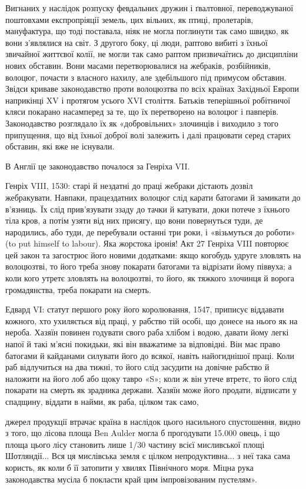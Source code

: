Вигнаних у наслідок розпуску февдальних дружин і ґвалтовної,
переводжуваної поштовхами експропріяції земель, цих
вільних, як птиці, пролетарів, мануфактура, що тоді поставала,
ніяк не могла поглинути так само швидко, як вони з’являлися
на світ. З другого боку, ці люди, раптово вибиті з їхньої звичайної
життєвої колії, не могли так само раптом призвичаїтись до
дисципліни нових обставин. Вони масами перетворювалися на
жебраків, розбійників, волоцюг, почасти з власного нахилу,
але здебільшого під примусом обставин. Звідси криваве законодавство
проти волоцюзтва по всіх країнах Західньої Европи
наприкінці XV і протягом усього XVI століття. Батьків теперішньої
робітничої кляси покарано насамперед за те, що їх перетворено
на волоцюг і павперів. Законодавство розглядало
їх як «добровільних» злочинців і виходило з того припущення,
що від їхньої доброї волі залежить і далі працювати серед старих
обставин, які вже не існували.

В Англії це законодавство почалося за Генріха VII.

Генріх VIII, 1530: старі й нездатні до праці жебраки дістають
дозвіл жебракувати. Навпаки, працездатних волоцюг слід карати
батогами й замикати до в’язниць. Їх слід прив’язувати ззаду до
тачки й катувати, доки потече з їхнього тіла кров, а потім узяти
від них присягу, що вони повернуться туди, де народились,
або туди, де перебували останні три роки, і «візьмуться до роботи»
(to put himself to labour). Яка жорстока іронія! Акт 27
Генріха VIII повторює цей закон та загострює його новими додатками:
якщо когобудь удруге зловлять на волоцюзтві, то його
треба знову покарати батогами та відрізати йому піввуха; а
коли кого утретє зловлять на волоцюзтві, то його, як тяжкого
злочинця й ворога громадянства, треба покарати на смерть.

Едвард VI: статут першого року його королювання, 1547,
приписує віддавати кожного, хто ухиляється від праці, у рабство
тій особі, що донесе на нього як на нероба. Хазяїн повинен годувати
свого раба хлібом і водою, давати йому легкі напої й такі
м’ясні покидьки, які він вважатиме за відповідні. Він має право
батогами й кайданами силувати його до всякої, навіть найогиднішої
праці. Коли раб відлучиться на два тижні, то його слід
засудити на довічне рабство й наложити на його лоб або щоку
тавро «S»; коли ж він утече втретє, то його слід покарати на
смерть як зрадника держави. Хазяїн може його продати, відписати
у спадщину, віддати в найми, як раба, цілком так само,

джерел продукції втрачає країна в наслідок цього насильного спустошення,
видно з того, що лісова площа Ben Aulder могла б прогодувати
15.000 овець, і що площа цього лісу становить лише 1/30 частину всієї
мисливської площі Шотляндії... Вся ця мислівська земля є цілком непродуктивна...
з неї така сама користь, як коли б її затопити у хвилях
Північного моря. Міцна рука законодавства мусіла б покласти край цим
імпровізованим пустелям».
\parbreak{}  %

